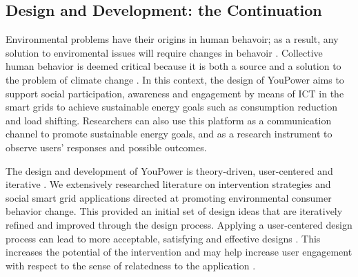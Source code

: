 
\subsection{Design and Development: the Continuation}

Environmental problems have their origins in human behavoir; as a result, any solution to enviromental issues will require changes in behavoir 
\citep{Schultz2014}.
Collective human behavior is deemed critical because it is both a source and a solution to the problem of climate change \citep{Masson2014}.
In this context, the design of YouPower aims to support social participation, awareness and engagement by means of ICT in the smart grids to achieve sustainable energy goals such as consumption reduction and load shifting. Researchers can also use this platform as a communication channel to promote sustainable energy goals, and as a research instrument to observe users' responses and possible outcomes. 



The design and development of YouPower is theory-driven, user-centered and iterative \citep{Leffingwell2000,Leffingwell2011}. We extensively researched literature on intervention strategies and social smart grid applications directed at promoting environmental consumer behavior change. This provided an initial set of design ideas that are iteratively refined and improved through the design process. Applying a user-centered design process can lead to more acceptable, satisfying and effective designs \citep{Brynjarsdottir2012}. This increases the potential of the intervention \citep{dick2012empowering} and may help increase user engagement with respect to the sense of relatedness to the application \citep{pierce2003state,schwartz2015people,edward2015review}. 

